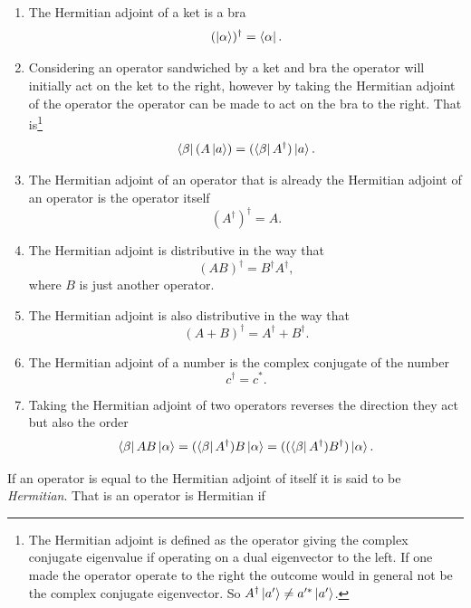 \begin{enumerate} 
	\item The Hermitian adjoint of a ket is a bra
	\begin{equation}
		(\ket{\alpha})^\dagger=\bra{\alpha}.
	\end{equation} 
	\item Considering an operator sandwiched by a ket and bra the operator will initially act on the ket to the right, however by taking the Hermitian adjoint of the operator the operator can be made to act on the bra to the right. That is\footnote{The Hermitian adjoint is defined as the operator giving the complex conjugate eigenvalue if operating on a dual eigenvector to the left. If one made the operator operate to the right the outcome would in general not be the complex conjugate eigenvector. So $A^\dagger\ket{a'}\neq a'^*\ket{a'}$.}
	\begin{equation}
		\bra{\beta}(A\ket{a})=(\bra{\beta}A^\dagger)\ket{a}.
	\end{equation} 
	\item The Hermitian adjoint of an operator that is already the Hermitian adjoint of an operator is the operator itself
	\begin{equation}
		(A^\dagger)^\dagger=A.
	\end{equation} 
	\item The Hermitian adjoint is distributive in the way that
	\begin{equation}
		(AB)^\dagger=B^\dagger A^\dagger,
	\end{equation} 
	where  $B$ is just another operator.
	\item The Hermitian adjoint is also distributive in the way that
	\begin{equation}
		(A+B)^\dagger=A^\dagger+B^\dagger.
	\end{equation} 
	\item The Hermitian adjoint of a number is the complex conjugate of the number
	\begin{equation}
		c^\dagger=c^*.
	\end{equation} 
	\item Taking the Hermitian adjoint of two operators reverses the direction they act but also the order
	\begin{equation}
		\bra{\beta}AB\ket{\alpha}=(\bra{\beta}A^\dagger)B\ket{\alpha}=((\bra{\beta}A^\dagger)B^\dagger)\ket{\alpha}.
	\end{equation} 
\end{enumerate}
If an operator is equal to the Hermitian adjoint of itself it is said to be \emph{Hermitian}. That is an operator is Hermitian if

